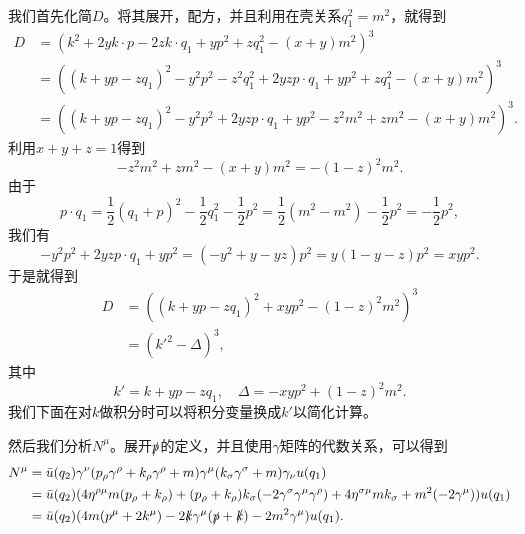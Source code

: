 我们首先化简$D$。将其展开，配方，并且利用在壳关系$q_1^2=m^2$，就得到
\[
    \begin{aligned}
        D &= (k^2 + 2y k \cdot p - 2z k \cdot q_1 + yp^2 + zq_1^2 - (x + y)m^2)^3 \\
        &= ((k + yp - z q_1)^2 - y^2 p^2 - z^2 q_1^2 + 2 yz p \cdot q_1 + y p^2 + z q_1^2 - (x + y) m^2)^3 \\
        &= ((k + yp - z q_1)^2 - y^2 p^2 + 2 yz p \cdot q_1 + y p^2 - z^2 m^2 + z m^2 - (x + y) m^2)^3.
    \end{aligned}
\]
利用$x + y + z = 1$得到
\[
    - z^2 m^2 + z m^2 - (x + y) m^2 = - (1-z)^2 m^2.
\]
由于
\[
    p \cdot q_1 = \frac{1}{2} (q_1 + p)^2 - \frac{1}{2} q_1^2 - \frac{1}{2} p^2 = \frac{1}{2} (m^2 - m^2) - \frac{1}{2} p^2 = - \frac{1}{2} p^2,
\]
我们有
\[
    - y^2 p^2 + 2 yz p \cdot q_1 + y p^2 = (-y^2 + y - yz) p^2 = y(1 - y - z) p^2 = xy p^2.
\]
于是就得到
\begin{equation}
    \begin{aligned}
        D &= ((k + yp - z q_1)^2 + xy p^2 - (1-z)^2 m^2)^3 \\
        &= (k'^2 - \Delta)^3,
    \end{aligned}
\end{equation}
其中
\begin{equation}
    k' = k + yp - z q_1, \quad \Delta = - xy p^2 + (1-z)^2 m^2.
\end{equation}
我们下面在对$k$做积分时可以将积分变量换成$k'$以简化计算。

然后我们分析$N^\mu$。展开$\slashed{p}$的定义，并且使用$\gamma$矩阵的代数关系，可以得到
\begin{equation}
    \begin{aligned}
        N^\mu &= \bar{u}(q_2) \gamma^\nu (p_\rho \gamma^\rho + k_\rho \gamma^\rho + m) \gamma^\mu (k_\sigma \gamma^\sigma + m) \gamma_\nu u(q_1) \\
        &= \bar{u}(q_2) (4 \eta^{\rho \mu} m (p_\rho + k_\rho) + (p_\rho + k_\rho) k_\sigma (- 2 \gamma^\sigma \gamma^\mu \gamma^\rho) + 4 \eta^{\sigma \mu} m k_\sigma + m^2 (-2 \gamma^\mu)) u(q_1) \\
        &= \bar{u}(q_2) (4 m (p^\mu + 2 k^\mu) - 2 \slashed{k} \gamma^\mu (\slashed{p} + \slashed{k}) - 2 m^2 \gamma^\mu) u(q_1).
    \end{aligned}
\end{equation}

